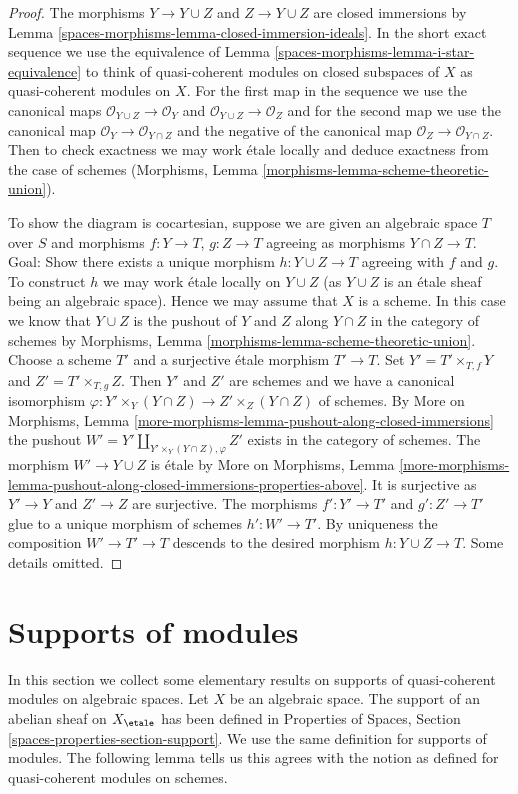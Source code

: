 \begin{proof}
The morphisms $Y \to Y \cup Z$ and $Z \to Y \cup Z$ are closed immersions
by Lemma \ref{spaces-morphisms-lemma-closed-immersion-ideals}. In the short exact sequence
we use the equivalence of Lemma \ref{spaces-morphisms-lemma-i-star-equivalence} to think of
quasi-coherent modules on closed subspaces of $X$ as quasi-coherent modules
on $X$. For the first map in the sequence we use the canonical maps
$\mathcal{O}_{Y \cup Z} \to \mathcal{O}_Y$ and
$\mathcal{O}_{Y \cup Z} \to \mathcal{O}_Z$
and for the second map we use the canonical map
$\mathcal{O}_Y \to \mathcal{O}_{Y \cap Z}$ and
the negative of the canonical map
$\mathcal{O}_Z \to \mathcal{O}_{Y \cap Z}$. Then to check
exactness we may work \'etale locally and deduce exactness
from the case of schemes
(Morphisms, Lemma \ref{morphisms-lemma-scheme-theoretic-union}).

\medskip\noindent
To show the diagram is cocartesian, suppose we are given an algebraic space
$T$ over $S$ and morphisms $f : Y \to T$, $g : Z \to T$ agreeing as morphisms
$Y \cap Z \to T$. Goal: Show there exists a unique morphism
$h : Y \cup Z \to T$ agreeing with $f$ and $g$.
To construct $h$ we may work \'etale locally on $Y \cup Z$
(as $Y \cup Z$ is an \'etale sheaf being an algebraic space).
Hence we may assume that $X$ is a scheme.
In this case we know that $Y \cup Z$ is the pushout
of $Y$ and $Z$ along $Y \cap Z$ in the category of schemes
by Morphisms, Lemma \ref{morphisms-lemma-scheme-theoretic-union}.
Choose a scheme $T'$ and a surjective \'etale morphism $T' \to T$.
Set $Y' = T' \times_{T, f} Y$ and $Z' = T' \times_{T, g} Z$.
Then $Y'$ and $Z'$ are schemes and we have a canonical isomorphism
$\varphi : Y' \times_Y (Y \cap Z) \to Z' \times_Z (Y \cap Z)$
of schemes. By More on Morphisms, Lemma
\ref{more-morphisms-lemma-pushout-along-closed-immersions}
the pushout $W' = Y' \amalg_{Y' \times_Y (Y \cap Z), \varphi} Z'$
exists in the category of schemes.
The morphism $W' \to Y \cup Z$ is \'etale by
More on Morphisms, Lemma
\ref{more-morphisms-lemma-pushout-along-closed-immersions-properties-above}.
It is surjective as $Y' \to Y$ and $Z' \to Z$ are surjective.
The morphisms $f' : Y' \to T'$ and $g' : Z' \to T'$
glue to a unique morphism of schemes $h' : W' \to T'$.
By uniqueness the composition $W' \to T' \to T$
descends to the desired morphism $h : Y \cup Z \to T$.
Some details omitted.
\end{proof}

\section{Supports of modules}
\label{spaces-morphisms-section-support}
In this section we collect some elementary results on supports of
quasi-coherent modules on algebraic spaces. Let $X$ be an algebraic
space. The support of an abelian sheaf on $X_\etale$
has been defined in Properties of Spaces, Section
\ref{spaces-properties-section-support}.
We use the same definition for supports of modules.
The following lemma tells us this agrees with the notion
as defined for quasi-coherent modules on schemes.

